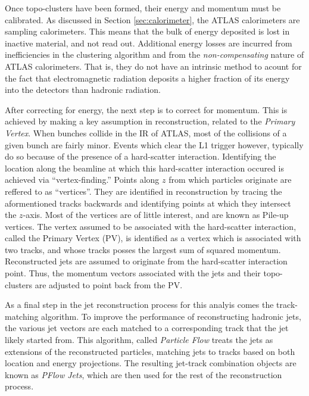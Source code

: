         Once topo-clusters have been formed, their energy and momentum must be calibrated.
        As discussed in Section \ref{sec:calorimeter}, the ATLAS calorimeters are sampling calorimeters.
        This means that the bulk of energy deposited is lost in inactive material, and not read out.
        Additional energy losses are incurred from inefficiencies in the clustering algorithm and from the \textit{non-compensating} nature of ATLAS calorimeters.
        That is, they do not have an intrinsic method to acount for the fact that electromagnetic radiation deposits a higher fraction of its energy into the detectors than hadronic radiation\cite{cell_clustering}.

        After correcting for energy, the next step is to correct for momentum.
        This is achieved by making a key assumption in reconstruction, related to the \textit{Primary Vertex}.
        When bunches collide in the IR of ATLAS, most of the collisions of a given bunch are fairly minor.
        Events which clear the L1 trigger however, typically do so because of the presence of a hard-scatter interaction.
        Identifying the location along the beamline at which this hard-scatter interaction occured is achieved via ``vertex-finding.''
        Points along $z$ from which particles originate are reffered to as ``vertices''.
        They are identified in reconstruction by tracing the aformentioned tracks backwards
            and identifying points at which they intersect the $z$-axis.
        Most of the vertices are of little interest, and are known as Pile-up vertices.
        The vertex assumed to be associated with the hard-scatter interaction, called the Primary Vertex (PV),
            is identified as a vertex which is associated with two tracks,
            and whose tracks posses the largest sum of squared momentum\cite{jet_energy_scale13TeV}.
        Reconstructed jets are assumed to originate from the hard-scatter interaction point.
        Thus, the momentum vectors associated with the jets and their topo-clusters are adjusted to point back from the PV.

        As a final step in the jet reconstruction process for this analyis comes the track-matching algorithm.
        To improve the performance of reconstructing hadronic jets,
            the various jet vectors are each matched to a corresponding track that the jet likely started from.
        This algorithm, called \textit{Particle Flow} treats the jets as extensions of the reconstructed particles,
            matching jets to tracks based on both location and energy projections.
        The resulting jet-track combination objects are known as \textit{PFlow Jets},
            which are then used for the rest of the reconstruction process\cite{pflow}.

